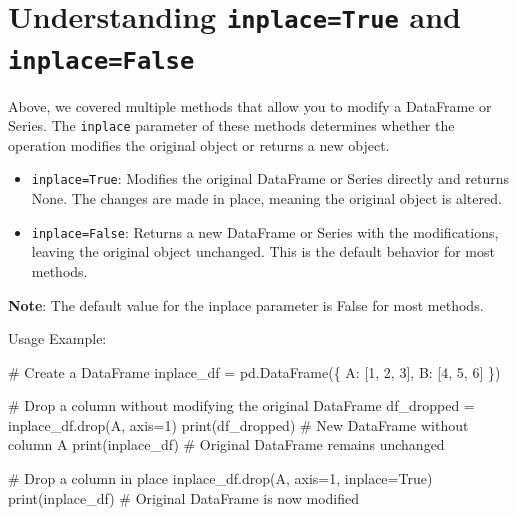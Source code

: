 \documentclass[
  letterpaper,
  DIV=11,
  numbers=noendperiod]{scrreprt}
\newenvironment{Shaded}{\begin{snugshade}}{\end{snugshade}}
\newcommand{\BuiltInTok}[1]{\textcolor[rgb]{0.00,0.23,0.31}{#1}}
\newcommand{\CommentTok}[1]{\textcolor[rgb]{0.37,0.37,0.37}{#1}}
\newcommand{\DecValTok}[1]{\textcolor[rgb]{0.68,0.00,0.00}{#1}}
\newcommand{\NormalTok}[1]{\textcolor[rgb]{0.00,0.23,0.31}{#1}}
\newcommand{\OperatorTok}[1]{\textcolor[rgb]{0.37,0.37,0.37}{#1}}
\newcommand{\StringTok}[1]{\textcolor[rgb]{0.13,0.47,0.30}{#1}}
\newcommand{\VariableTok}[1]{\textcolor[rgb]{0.07,0.07,0.07}{#1}}
\providecommand{\tightlist}{%
  \setlength{\itemsep}{0pt}\setlength{\parskip}{0pt}}\usepackage{longtable,booktabs,array}
\begin{document}
\hypertarget{understanding-inplacetrue-and-inplacefalse}{%
\section{\texorpdfstring{Understanding \texttt{inplace=True} and
\texttt{inplace=False}}{Understanding inplace=True and inplace=False}}\label{understanding-inplacetrue-and-inplacefalse}}

Above, we covered multiple methods that allow you to modify a DataFrame
or Series. The \texttt{inplace} parameter of these methods determines
whether the operation modifies the original object or returns a new
object.

\begin{itemize}
\tightlist
\item
  \texttt{inplace=True}: Modifies the original DataFrame or Series
  directly and returns None. The changes are made in place, meaning the
  original object is altered.
\item
  \texttt{inplace=False}: Returns a new DataFrame or Series with the
  modifications, leaving the original object unchanged. This is the
  default behavior for most methods.
\end{itemize}

\textbf{Note}: The default value for the inplace parameter is False for
most methods.

Usage Example:

\begin{Shaded}
\begin{Highlighting}[]
\CommentTok{\# Create a DataFrame}
\NormalTok{inplace\_df }\OperatorTok{=}\NormalTok{ pd.DataFrame(\{}
    \StringTok{\textquotesingle{}A\textquotesingle{}}\NormalTok{: [}\DecValTok{1}\NormalTok{, }\DecValTok{2}\NormalTok{, }\DecValTok{3}\NormalTok{],}
    \StringTok{\textquotesingle{}B\textquotesingle{}}\NormalTok{: [}\DecValTok{4}\NormalTok{, }\DecValTok{5}\NormalTok{, }\DecValTok{6}\NormalTok{]}
\NormalTok{\})}

\CommentTok{\# Drop a column without modifying the original DataFrame}
\NormalTok{df\_dropped }\OperatorTok{=}\NormalTok{ inplace\_df.drop(}\StringTok{\textquotesingle{}A\textquotesingle{}}\NormalTok{, axis}\OperatorTok{=}\DecValTok{1}\NormalTok{)}
\BuiltInTok{print}\NormalTok{(df\_dropped)  }\CommentTok{\# New DataFrame without column \textquotesingle{}A\textquotesingle{}}
\BuiltInTok{print}\NormalTok{(inplace\_df)          }\CommentTok{\# Original DataFrame remains unchanged}

\CommentTok{\# Drop a column in place}
\NormalTok{inplace\_df.drop(}\StringTok{\textquotesingle{}A\textquotesingle{}}\NormalTok{, axis}\OperatorTok{=}\DecValTok{1}\NormalTok{, inplace}\OperatorTok{=}\VariableTok{True}\NormalTok{)}
\BuiltInTok{print}\NormalTok{(inplace\_df)          }\CommentTok{\# Original DataFrame is now modified}
\end{Highlighting}
\end{Shaded}
\end{document}
